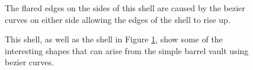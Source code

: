 \documentclass{thesis}
\begin{document}
\begin{figure}
\caption[Flared shell]{The flared edges on the sides of this shell are caused by the bezier curves on either side
allowing the edges of the shell to rise up.}
\label{fig:thing_with_wings}
\end{figure}

\begin{figure}
\caption[Modified barrel vault]{This shell, as well as the shell in Figure \ref{fig:thing_with_wings}, show some of the
interesting shapes that can arise from the simple barrel vault using bezier curves.}
\label{fig:countercurve}
\end{figure}
\end{document}
